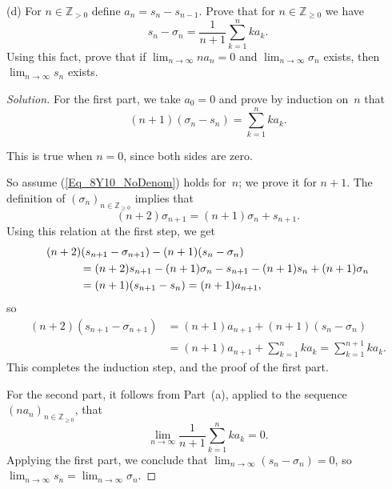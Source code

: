 \documentclass[10pt]{amsart}
\newcommand{\limi}[1]{\lim_{{#1} \to \infty}}
\theoremstyle{definition}
\newcommand{\sm}{\sigma}
\newcommand{\N}{{\mathbb{Z}}_{> 0}}
\newcommand{\Nz}{{\mathbb{Z}}_{\geq 0}}
\begin{document}
(d)
For $n \in \N$ define $a_n = s_n - s_{n - 1}$.
Prove that for $n \in \Nz$ we have
\[
s_n - \sm_n = \frac{1}{n + 1} \sum_{k = 1}^n k a_k.
\]
Using this fact,
prove that if $\limi{n} n a_n = 0$ and $\limi{n} \sm_n$ exists,
then $\limi{n} s_n$ exists.

\begin{proof}[Solution]
For the first part,
we take $a_0 = 0$ and prove by induction on~$n$ that
%
\begin{equation}\label{Eq_8Y10_NoDenom}
(n + 1) (\sm_n - s_n) = \sum_{k = 1}^n k a_k.
\end{equation}
%

This is true when $n = 0$,
since both sides are zero.

So assume (\ref{Eq_8Y10_NoDenom}) holds for~$n$;
we prove it for $n + 1$.
The definition of $(\sm_n)_{n \in \Nz}$
implies that
\[
(n + 2) \sm_{n + 1} = (n + 1) \sm_n + s_{n + 1}.
\]
Using this relation at the first step,
we get
%
\begin{align*}
& (n + 2) (s_{n + 1} - \sm_{n + 1}) - (n + 1) (s_n - \sm_n)
\\
& \hspace*{3em} {\mbox{}}
  = (n + 2) s_{n + 1} - (n + 1) \sm_n - s_{n + 1}
    - (n + 1) s_n + (n + 1) \sm_n
\\
& \hspace*{3em} {\mbox{}}
  = (n + 1) (s_{n + 1} - s_n)
  = (n + 1) a_{n + 1},
\end{align*}
%
so
\begin{align*}
(n + 2) (s_{n + 1} - \sm_{n + 1})
& = (n + 1) a_{n + 1} + (n + 1) (s_n - \sm_n)
\\
& = (n + 1) a_{n + 1} + \sum_{k = 1}^n k a_k
  = \sum_{k = 1}^{n + 1} k a_k.
\end{align*}
This completes the induction step,
and the proof of the first part.

For the second part,
it follows from Part~(a),
applied to the sequence $(n a_n)_{n \in \Nz}$,
that
\[
\limi{n} \frac{1}{n + 1} \sum_{k = 1}^n k a_k = 0.
\]
Applying the first part,
we conclude that
$\limi{n} (s_n - \sm_n) = 0$,
so
$\limi{n} s_n = \limi{n} \sm_n$.
\end{proof}
\end{document}
